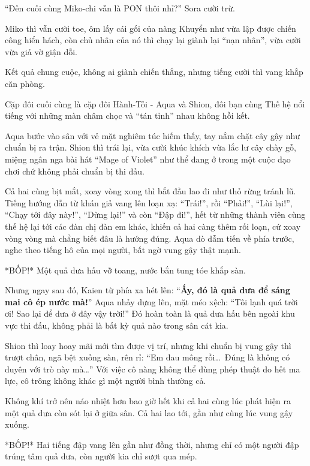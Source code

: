 \documentclass[../main.tex]{subfiles}
\begin{document}
``Đến cuối cùng Miko-chi vẫn là PON thôi nhỉ?'' Sora cười trừ.

Miko thì vẫn cười toe, ôm lấy cái gối của nàng Khuyển như vừa lập được chiến công hiển hách, còn chủ nhân của nó thì chạy lại giành lại ``nạn nhân'', vừa cười vừa giả vờ giận dỗi.

Kết quả chung cuộc, không ai giành chiến thắng, nhưng tiếng cười thì vang khắp căn phòng.

\ct

Cặp đôi cuối cùng là cặp đôi Hành-Tỏi - Aqua và Shion, đôi bạn cùng Thế hệ nổi tiếng với những màn châm chọc và ``tán tỉnh'' nhau không hồi kết.

Aqua bước vào sân với vẻ mặt nghiêm túc hiếm thấy, tay nắm chặt cây gậy như chuẩn bị ra trận. Shion thì trái lại, vừa cười khúc khích vừa lắc lư cây chày gỗ, miệng ngân nga bài hát ``Mage of Violet'' như thể đang ở trong một cuộc dạo chơi chứ không phải chuẩn bị thi đấu.

Cả hai cùng bịt mắt, xoay vòng xong thì bắt đầu lao đi như thỏ rừng tránh lũ. Tiếng hướng dẫn từ khán giả vang lên loạn xạ: ``Trái!'', rồi ``Phải!'', ``Lùi lại!'', ``Chạy tới đây này!'', ``Dừng lại!'' và còn ``Đập đi!'', hết từ những thành viên cùng thế hệ lại tới các đàn chị đàn em khác, khiến cả hai càng thêm rối loạn, cứ xoay vòng vòng mà chẳng biết đâu là hướng đúng. Aqua dò dẫm tiến về phía trước, nghe theo tiếng hô của mọi người, bất ngờ vung gậy thật mạnh.

*BỐP!* Một quả dưa hấu vỡ toang, nước bắn tung tóe khắp sàn.

Nhưng ngay sau đó, Kaien từ phía xa hét lên: ``\textbf{Ấy, đó là quả dưa để sáng mai cô ép nước mà!}'' Aqua nhảy dựng lên, mặt méo xệch: ``Tôi lạnh quá trời ơi! Sao lại để dưa ở đây vậy trời!'' Đó hoàn toàn là quả dưa hấu bên ngoài khu vực thi đấu, không phải là bất kỳ quả nào trong sân cát kia.

Shion thì loay hoay mãi mới tìm được vị trí, nhưng khi chuẩn bị vung gậy thì trượt chân, ngã bệt xuống sàn, rên rỉ: ``Em đau mông rồi\dots\ Đúng là không có duyên với trò này mà\dots'' Với việc cô nàng không thể dùng phép thuật do hết ma lực, cô trông không khác gì một người bình thường cả.

Không khí trở nên náo nhiệt hơn bao giờ hết khi cả hai cùng lúc phát hiện ra một quả dưa còn sót lại ở giữa sân. Cả hai lao tới, gần như cùng lúc vung gậy xuống.

*BỐP!* Hai tiếng đập vang lên gần như đồng thời, nhưng chỉ có một người đập trúng tâm quả dưa, còn người kia chỉ sượt qua mép.
\end{document}
